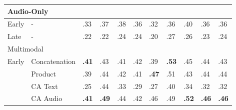 \documentclass{article}
\begin{document}
\begin{table}[H]
\begin{tabular}{|lllllllllll|}
\multicolumn{11}{|l|}{Audio-Only}                                                                                                                                                                                                                                                                      \\ \hline
\multicolumn{1}{|l|}{Early}                  & \multicolumn{1}{l|}{-}             & .33                & .37                & .38                & .36                & .32                & .36                & .40                & \multicolumn{1}{l|}{.36}                & .36                   \\
\multicolumn{1}{|l|}{Late}                   & \multicolumn{1}{l|}{-}             & .22                & .22                & .24                & .24                & .20                & .27                & .26                & \multicolumn{1}{l|}{.23}                & .24                   \\ \hline
\multicolumn{11}{|l|}{Multimodal}                                                                                                                                                                                                                                                                      \\ \hline
\multicolumn{1}{|l|}{\multirow{4}{*}{Early}} & \multicolumn{1}{l|}{Concatenation} & \textbf{.41}       & .43                & .41                & .42                & .39                & \textbf{.53}       & .45                & \multicolumn{1}{l|}{.44}                & .43                   \\
\multicolumn{1}{|l|}{}                       & \multicolumn{1}{l|}{Product}       & .39                & .44                & .42                & .41                & \textbf{.47}       & .51                & .43                & \multicolumn{1}{l|}{.44}                & .44                   \\
\multicolumn{1}{|l|}{}                       & \multicolumn{1}{l|}{CA Text}       & .25                & .44                & .33                & .29                & .27                & .40                & .34                & \multicolumn{1}{l|}{.32}                & .32                   \\
\multicolumn{1}{|l|}{}                       & \multicolumn{1}{l|}{CA Audio}      & \textbf{.41}       & \textbf{.49}       & .44                & .42                & .46                & .49                & \textbf{.52}       & \multicolumn{1}{l|}{\textbf{.46}}       & \textbf{.46}          \\ \hline

\end{tabular}
\end{table}
\end{document}
